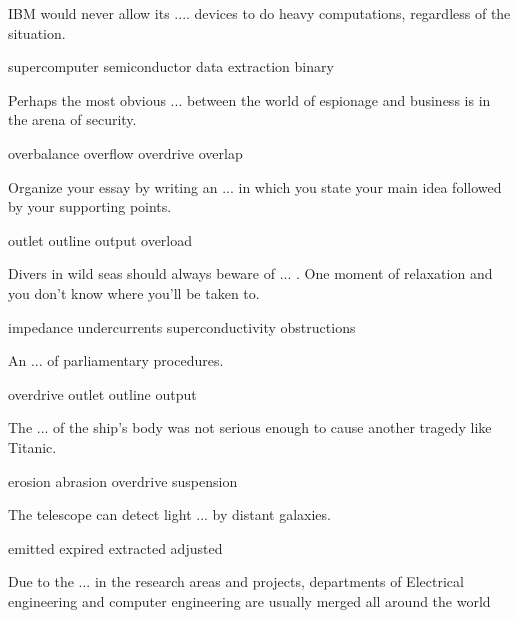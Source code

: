 \documentclass{exam}
\begin{document}
\begin{questions}
\question IBM would never allow its  .... devices to do heavy computations, regardless of the situation.\\
\begin{oneparchoices} 
\correctchoice supercomputer
\choice semiconductor 
\choice data extraction
\choice binary 
\end{oneparchoices}
\question Perhaps the most obvious ... between the world of espionage and business is in the arena of security.\\
\begin{oneparchoices}
\choice overbalance
 \choice overflow
 \choice overdrive
 \correctchoice overlap
\end{oneparchoices}
\question Organize your essay by writing an ... in which you state your main idea followed by your supporting points.\\
\begin{oneparchoices}
\choice outlet
 \correctchoice outline
 \choice output
 \choice overload 
\end{oneparchoices}
\question Divers in wild seas should always beware of ... . One moment of relaxation and you don't know where you'll be taken to.\\
\begin{oneparchoices}
\choice impedance
\correctchoice undercurrents
\choice superconductivity
\choice obstructions 
\end{oneparchoices}
\question An ... of parliamentary procedures.\\
\begin{oneparchoices}
\choice overdrive
\choice outlet
\correctchoice outline
\choice output
\end{oneparchoices}
\question The ... of the ship's body was not serious enough to cause another tragedy like Titanic.\\
\begin{oneparchoices} 
\correctchoice erosion
 \choice abrasion 
 \choice overdrive
 \choice suspension
\end{oneparchoices}
\question The telescope can detect light ... by distant galaxies.\\
\begin{oneparchoices}
 \correctchoice emitted
 \choice expired 
 \choice extracted
 \choice adjusted
\end{oneparchoices}
\question Due to the ... in the research areas and projects, departments of Electrical engineering and computer engineering are usually merged all around the world
\\

\end{questions}
\end{document}
